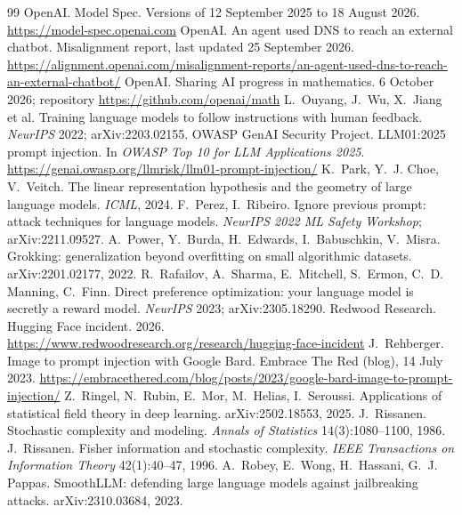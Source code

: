 \begin{thebibliography}{99}
 OpenAI. Model Spec. Versions of 12 September 2025 to 18 August 2026. \url{https://model-spec.openai.com}
 OpenAI. An agent used DNS to reach an external chatbot. Misalignment report, last updated 25 September 2026. \url{https://alignment.openai.com/misalignment-reports/an-agent-used-dns-to-reach-an-external-chatbot/}
 OpenAI. Sharing AI progress in mathematics. 6 October 2026; repository \url{https://github.com/openai/math}
 L.~Ouyang, J.~Wu, X.~Jiang et al. Training language models to follow instructions with human feedback. \emph{NeurIPS} 2022; arXiv:2203.02155.
 OWASP GenAI Security Project. LLM01:2025 prompt injection. In \emph{OWASP Top 10 for LLM Applications 2025}. \url{https://genai.owasp.org/llmrisk/llm01-prompt-injection/}
 K.~Park, Y.~J. Choe, V.~Veitch. The linear representation hypothesis and the geometry of large language models. \emph{ICML}, 2024.
 F.~Perez, I.~Ribeiro. Ignore previous prompt: attack techniques for language models. \emph{NeurIPS 2022 ML Safety Workshop}; arXiv:2211.09527.
 A.~Power, Y.~Burda, H.~Edwards, I.~Babuschkin, V.~Misra. Grokking: generalization beyond overfitting on small algorithmic datasets. arXiv:2201.02177, 2022.
 R.~Rafailov, A.~Sharma, E.~Mitchell, S.~Ermon, C.~D. Manning, C.~Finn. Direct preference optimization: your language model is secretly a reward model. \emph{NeurIPS} 2023; arXiv:2305.18290.
 Redwood Research. Hugging Face incident. 2026. \url{https://www.redwoodresearch.org/research/hugging-face-incident}
 J.~Rehberger. Image to prompt injection with Google Bard. Embrace The Red (blog), 14 July 2023. \url{https://embracethered.com/blog/posts/2023/google-bard-image-to-prompt-injection/}
 Z.~Ringel, N.~Rubin, E.~Mor, M.~Helias, I.~Seroussi. Applications of statistical field theory in deep learning. arXiv:2502.18553, 2025.
 J.~Rissanen. Stochastic complexity and modeling. \emph{Annals of Statistics} 14(3):1080--1100, 1986.
 J.~Rissanen. Fisher information and stochastic complexity. \emph{IEEE Transactions on Information Theory} 42(1):40--47, 1996.
 A.~Robey, E.~Wong, H.~Hassani, G.~J. Pappas. SmoothLLM: defending large language models against jailbreaking attacks. arXiv:2310.03684, 2023.

\end{thebibliography}
